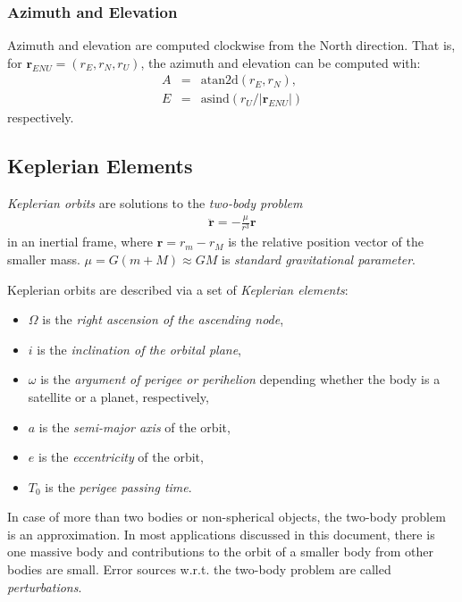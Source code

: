 \documentclass [12pt, a4paper] {article}
\newcommand{\vc}[1]
{
	\boldsymbol{#1}
}
\begin{document}
\subsubsection{Azimuth and Elevation}
Azimuth and elevation are computed clockwise from the North direction.
That is, for $\vc r_{ENU} = (r_E, r_N, r_U)$, the azimuth and elevation can be computed
with: 
\begin {eqnarray}
  A &=& \textrm{atan2d}(r_E, r_N), \\ 
  E &=& \textrm{asind}(r_U / |\vc r_{ENU}|)
\end {eqnarray}
respectively. 

\subsection{Keplerian Elements}
\emph{Keplerian orbits} are solutions to the \emph{two-body problem}
\begin {eqnarray}
  \ddot{\vc r} = -\frac{\mu}{r^3}\vc r
\end {eqnarray}
in an inertial frame, where $\vc r=r_m - r_M$ is the relative position vector 
of the smaller mass. $\mu = G(m + M)\approx GM$ is \emph{standard gravitational 
parameter}. 

Keplerian orbits are described via a set of \emph{Keplerian elements}:
\begin {itemize}
  \item $\Omega$ is the \emph{right ascension of the ascending node},
  \item $i$ is the \emph{inclination of the orbital plane},
  \item $\omega$ is the \emph{argument of perigee or perihelion} depending whether
  the body is a satellite or a planet, respectively, 
  \item $a$ is the \emph{semi-major axis} of the orbit,
  \item $e$ is the \emph{eccentricity} of the orbit,
  \item $T_0$ is the \emph{perigee passing time}.
\end {itemize}

In case of more than two bodies or non-spherical objects, the two-body problem
is an approximation. In most applications discussed in this document, there is
one massive body and contributions to the orbit of a smaller body from other 
bodies are small. Error sources w.r.t. the two-body problem are called 
\emph{perturbations}.
\end{document}
